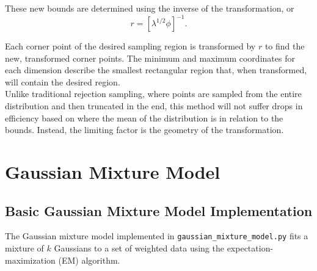 \documentclass{article}
\begin{document}
These new bounds are determined using the inverse of the transformation, or
\begin{equation}
    r = [\lambda^{1/2} \phi]^{-1}.
\end{equation}

Each corner point of the desired sampling region is transformed by $r$ to find
the new, transformed corner points.  The minimum and maximum coordinates for
each dimension describe the smallest rectangular region that, when transformed,
will contain the desired region. \\

Unlike traditional rejection sampling, where points are sampled from the entire
distribution and then truncated in the end, this method will not suffer drops in
efficiency based on where the mean of the distribution is in relation to the
bounds. Instead, the limiting factor is the geometry of the transformation.

\section{Gaussian Mixture Model}

\subsection{Basic Gaussian Mixture Model Implementation}

The Gaussian mixture model implemented in \texttt{gaussian\_mixture\_model.py}
fits a mixture of $k$ Gaussians to a set of weighted data using the
expectation-maximization (EM) algorithm. \\
\end{document}
